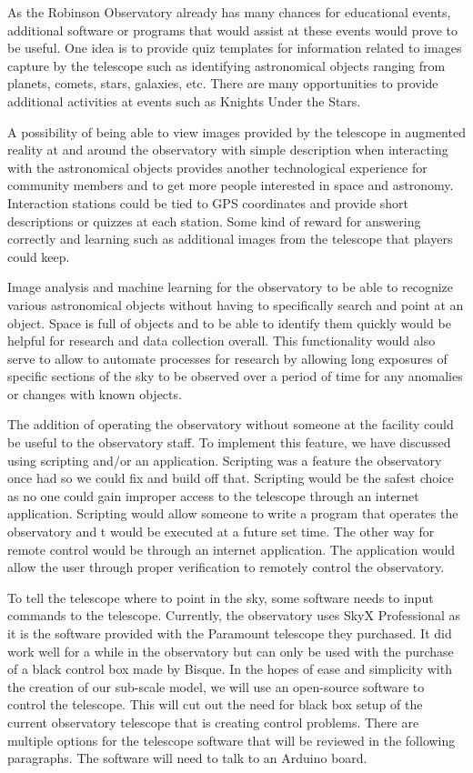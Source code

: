\documentclass[12pt]{report}
\begin{document}
As the Robinson Observatory already has many chances for educational events, additional software or programs that would assist at these events would prove to be useful.  One idea is to provide quiz templates for information related to images capture by the telescope such as identifying astronomical objects ranging from planets, comets, stars, galaxies, etc.  There are many opportunities to provide additional activities at events such as Knights Under the Stars.  

A possibility of being able to view images provided by the telescope in augmented reality at and around the observatory with simple description when interacting with the astronomical objects provides another technological experience for community members and to get more people interested in space and astronomy.  Interaction stations could be tied to GPS coordinates and provide short descriptions or quizzes at each station.  Some kind of reward for answering correctly and learning such as additional images from the telescope that players could keep.  

Image analysis and machine learning for the observatory to be able to recognize various astronomical objects without having to specifically search and point at an object.  Space is full of objects and to be able to identify them quickly would be helpful for research and data collection overall.  This functionality would also serve to allow to automate processes for research by allowing long exposures of specific sections of the sky to be observed over a period of time for any anomalies or changes with known objects.  

The addition of operating the observatory without someone at the facility could be useful to the observatory staff. To implement this feature, we have discussed using scripting and/or an application. Scripting was a feature the observatory once had so we could fix and build off that. Scripting would be the safest choice as no one could gain improper access to the telescope through an internet application. Scripting would allow someone to write a program that operates the observatory and t would be executed at a future set time. The other way for remote control would be through an internet application. The application would allow the user through proper verification to remotely control the observatory.

To tell the telescope where to point in the sky, some software needs to input commands to the telescope. Currently, the observatory uses SkyX Professional as it is the software provided with the Paramount telescope they purchased. It did work well for a while in the observatory but can only be used with the purchase of a black control box made by Bisque. In the hopes of ease and simplicity with the creation of our sub-scale model, we will use an open-source software to control the telescope. This will cut out the need for black box setup of the current observatory telescope that is creating control problems. There are multiple options for the telescope software that will be reviewed in the following paragraphs. The software will need to talk to an Arduino board.
\end{document}
